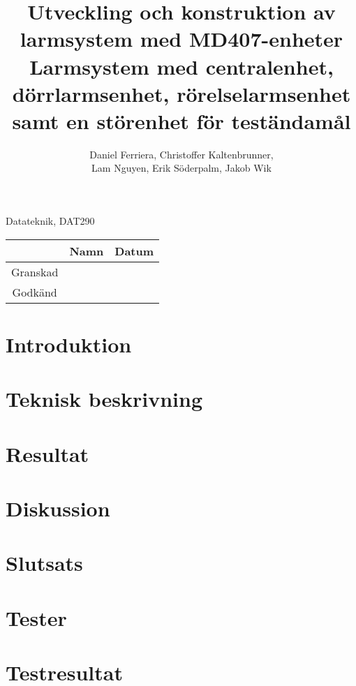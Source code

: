 \documentclass[a4paper]{article}
\begin{document}
\title{\textbf{Utveckling och konstruktion av larmsystem med MD407-enheter} \newline \newline \large Larmsystem med centralenhet, dörrlarmsenhet, rörelselarmsenhet samt en störenhet för teständamål}
\author{Daniel Ferriera, Christoffer Kaltenbrunner, \\Lam Nguyen, Erik Söderpalm, Jakob Wik}
\maketitle

\begin{center}
Datateknik, DAT290
\end{center}

\begin{table}
\centering
\begin{tabular}{|c|c|c|}   \hline
         & Namn & Datum \\ \hline
Granskad &      &       \\ \hline
Godkänd  &      &       \\ \hline
\end{tabular}
\end{table}

\newpage


\tableofcontents
\newpage


\section{Introduktion}

\newpage

\section{Teknisk beskrivning}

\newpage

\section{Resultat}

\newpage

\section{Diskussion}
\label{sec:Diskussion}

\newpage

\section{Slutsats}

\newpage

\appendix
\section{Tester}
\label{sec:app_a}

\newpage

\section{Testresultat}
\label{sec:app_b}

\newpage


\end{document}
